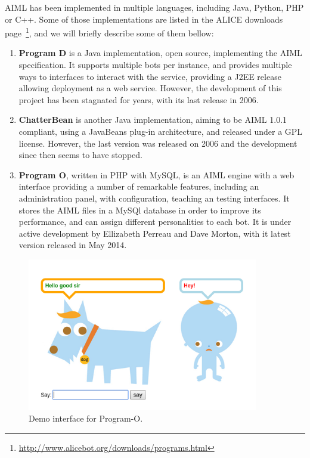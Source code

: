 \ac{AIML} has been implemented in multiple languages, including Java, Python, PHP or C++. Some of those implementations are listed in the ALICE downloads page~\footnote{\url{http://www.alicebot.org/downloads/programs.html}}, and we will briefly describe some of them bellow:

\begin{enumerate}
 \item \textbf{Program D} is a Java implementation, open source, implementing the \ac{AIML} specification. It supports multiple bots per instance, and provides multiple ways to interfaces to interact with the service, providing a J2EE release allowing deployment as a web service. However, the development of this project has been stagnated for years, with its last release in 2006.
 \item \textbf{ChatterBean} is another Java implementation, aiming to be \ac{AIML} 1.0.1 compliant, using a JavaBeans plug-in architecture, and released under a GPL license. However, the last version was released on 2006 and the development since then seems to have stopped.
 \item \textbf{Program O}, written in PHP with MySQL, is an \ac{AIML} engine with a web interface providing a number of remarkable features, including an administration panel, with configuration, teaching an testing interfaces. It stores the \ac{AIML} files in a MySQl database in order to improve its performance, and can assign different personalities to each bot. It is under active development by Ellizabeth Perreau and Dave Morton, with it latest version released in May 2014. 
\end{enumerate}

\begin{figure}[!htbp]
    \centering
    \includegraphics[width=0.9\textwidth]{img/screens/programo.png}
    \caption{Demo interface for Program-O.}
    \label{fig:programo1}
\end{figure}

